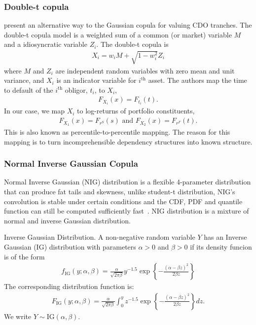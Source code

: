 \subsubsection{Double-t copula}\label{subsec:double-t-copula}
\cite{hull2006valuing} present an alternative way to the Gaussian copula for valuing CDO tranches.
The double-t copula model is a weighted sum of a common (or market) variable $M$ and a idiosyncratic variable $Z_i$.
The double-t copula is
\begin{align} \label{eq:one-fator-model}
X_i = w_i M + \sqrt{1-w_i^2} Z_i
\end{align}
where $M$ and $Z_i$ are independent random variables with zero mean and unit variance, and $X_i$ is an indicator variable for $i^\text{th}$ asset.
The authors map the time to default of the $i^\text{th}$ obligor, $t_i$, to $X_i$,
\begin{align}
    F_{X_i}(x) = F_{t_i}(t).
    \end{align}
In our case, we map $X_i$ to log-returns of portfolio constituents,
\begin{align}
    F_{X_1}(x) = F_{r^S}(s) \text{ and } F_{X_2}(x) = F_{r^F}(t).
    \end{align}
This is also known as percentile-to-percentile mapping\citep{hull2006defining}.
The reason for this mapping is to turn incomprehensible dependency structures into known structure.

\subsubsection{Normal Inverse Gaussian Copula}
Normal Inverse Gaussian (NIG) distribution is a flexible 4-parameter distribution that can produce fat tails and skewness, unlike student-t distribution,
NIG's convolution is stable under certain conditions and the CDF, PDF and quantile function can still be computed sufficiently fast~\cite[chapter 5]{schlosser2011pricing}.
NIG distribution is a mixture of normal and inverse Gaussian distribution.
\begin{definition} Inverse Gaussian Distribution.
    A non-negative random variable $Y$ has an Inverse Gaussian (IG) distribution with parameters $\alpha >0$ and $\beta >0$ if its density funcion is of the form
    \begin{align}
        f_\text{IG}(y; \alpha, \beta) = \frac{\alpha}{\sqrt{2\pi \beta}}y^{-1.5} \exp\left\{
        -\frac{(\alpha - \beta z)^2}{2\beta z}
        \right\}
    \end{align}
    The corresponding distribution function is:
        \begin{align}
        F_\text{IG}(y; \alpha, \beta) = \frac{\alpha}{\sqrt{2\pi \beta}}
        \int_0^y z^{-1.5} \exp\left\{
        -\frac{(\alpha - \beta z)^2}{2\beta z}
        \right\}
            dz.
    \end{align}
    We write $Y \sim \text{IG}(\alpha, \beta)$.
    \end{definition}

